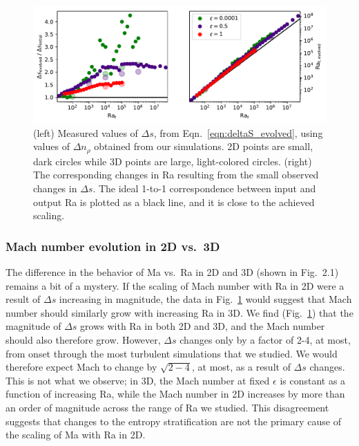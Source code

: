 \begin{figure}[t!]
\includegraphics[width=\textwidth]{./figs/revisions/delta_S_vs_ra.pdf}
\caption[Measured values of evolved entropy jump and Ra in polytropic simulations.]{ 
	      (left) Measured values of $\Delta s$, from Eqn.~\ref{eqn:deltaS_evolved}, using values of $\Delta n_\rho$ obtained from our simulations.
		  2D points are small, dark circles while 3D points are large, light-colored circles.
		  (right) The corresponding changes in Ra resulting from the small observed changes in $\Delta s$.
		  The ideal 1-to-1 correspondence between input and output Ra is plotted as a black line, and it is close to the achieved scaling.
	\label{fig:delta_S_vs_ra} }
\end{figure}


\subsubsection{Mach number evolution in 2D vs.~3D}
The difference in the behavior of Ma vs.~Ra in 2D and 3D (shown in Fig.~2.1) remains a bit of a mystery.
If the scaling of Mach number with Ra in 2D were a result of $\Delta s$ increasing in magnitude, the data in Fig.~\ref{fig:delta_S_vs_ra} would suggest that Mach number should similarly grow with increasing Ra in 3D.
We find (Fig.~\ref{fig:delta_S_vs_ra}) that the magnitude of $\Delta s$ grows with Ra in both 2D and 3D, and the Mach number should also therefore grow.
However, $\Delta s$ changes only by a factor of 2-4, at most, from onset through the most turbulent simulations that we studied.
We would therefore expect Mach to change by $\sqrt{2-4}$, at most, as a result of $\Delta s$ changes.
This is not what we observe; in 3D, the Mach number at fixed $\epsilon$ is constant as a function of increasing Ra, while the Mach number in 2D increases by more than an order of magnitude across the range of Ra we studied.
This disagreement suggests that changes to the entropy stratification are not the primary cause of the scaling of Ma with Ra in 2D.

